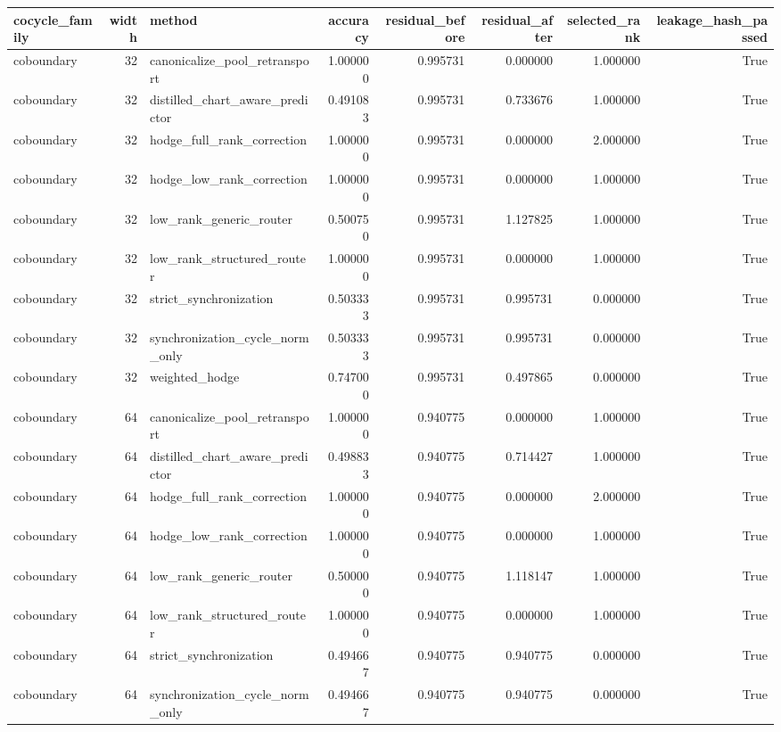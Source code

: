 \begin{tabular}{lrlrrrrr}
\toprule
cocycle_family & width & method & accuracy & residual_before & residual_after & selected_rank & leakage_hash_passed \\
\midrule
coboundary & 32 & canonicalize_pool_retransport & 1.000000 & 0.995731 & 0.000000 & 1.000000 & True \\
coboundary & 32 & distilled_chart_aware_predictor & 0.491083 & 0.995731 & 0.733676 & 1.000000 & True \\
coboundary & 32 & hodge_full_rank_correction & 1.000000 & 0.995731 & 0.000000 & 2.000000 & True \\
coboundary & 32 & hodge_low_rank_correction & 1.000000 & 0.995731 & 0.000000 & 1.000000 & True \\
coboundary & 32 & low_rank_generic_router & 0.500750 & 0.995731 & 1.127825 & 1.000000 & True \\
coboundary & 32 & low_rank_structured_router & 1.000000 & 0.995731 & 0.000000 & 1.000000 & True \\
coboundary & 32 & strict_synchronization & 0.503333 & 0.995731 & 0.995731 & 0.000000 & True \\
coboundary & 32 & synchronization_cycle_norm_only & 0.503333 & 0.995731 & 0.995731 & 0.000000 & True \\
coboundary & 32 & weighted_hodge & 0.747000 & 0.995731 & 0.497865 & 0.000000 & True \\
coboundary & 64 & canonicalize_pool_retransport & 1.000000 & 0.940775 & 0.000000 & 1.000000 & True \\
coboundary & 64 & distilled_chart_aware_predictor & 0.498833 & 0.940775 & 0.714427 & 1.000000 & True \\
coboundary & 64 & hodge_full_rank_correction & 1.000000 & 0.940775 & 0.000000 & 2.000000 & True \\
coboundary & 64 & hodge_low_rank_correction & 1.000000 & 0.940775 & 0.000000 & 1.000000 & True \\
coboundary & 64 & low_rank_generic_router & 0.500000 & 0.940775 & 1.118147 & 1.000000 & True \\
coboundary & 64 & low_rank_structured_router & 1.000000 & 0.940775 & 0.000000 & 1.000000 & True \\
coboundary & 64 & strict_synchronization & 0.494667 & 0.940775 & 0.940775 & 0.000000 & True \\
coboundary & 64 & synchronization_cycle_norm_only & 0.494667 & 0.940775 & 0.940775 & 0.000000 & True \\

\end{tabular}
